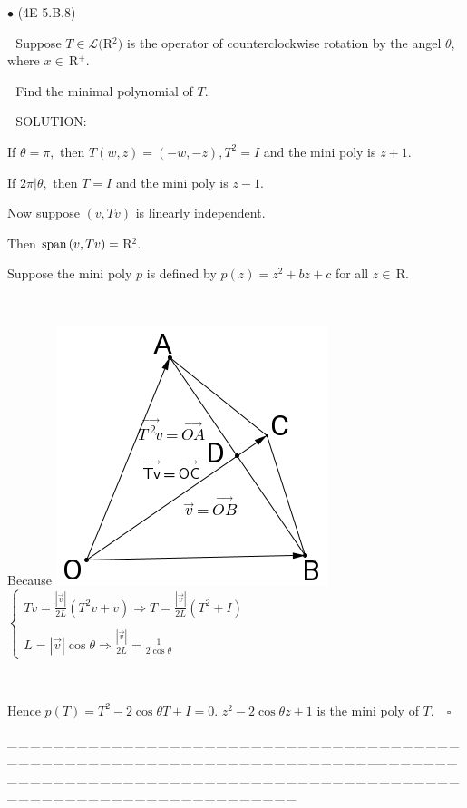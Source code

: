 \documentclass[a4paper, 11pt, UTF8]{article}
\def\Spn{\textup{span}\,}
\def\Lm{\mathcal{L}}
\def\Rbfc{$\,{\timesbf R}$}
\begin{document}
\begin{large}
{\small $\bullet$} ({\normalsize 4E 5.B.8})\par\,\, {\timessl\Large 
Suppose $T\in\Lm(${\timesbf R}$^2)$ is the operator of counterclockwise rotation by the angel $\theta$, where $x\in\Rbfc^+$.}\par\,\,
{\timessl\Large Find the minimal polynomial of $T$.}\par\,\,
{\timesbf S\footnotesize{OLUTION:}}\par\quad
If $\theta=\pi,$ then $T(w,z)=(-w,-z),T^2=I$ and the mini poly is $z+1.$\par\quad
If $2\pi|\theta,$ then $T=I$ and the mini poly is $z-1.$\par\quad
Now suppose $(v,Tv)$ is linearly independent.\par\quad
Then $\Spn(v,Tv)=\Rbfc^2.$\par\quad
Suppose the mini poly $p$ is defined by $p(z)=z^2+bz+c$ for all $z\in\Rbfc.$\par{\tiny\,\par}\quad
Because \includegraphics[scale=0.25]{./diagram.png} $\left\{\begin{array}{l}Tv=\displaystyle\frac{|\overset{\rightarrow}{v}|}{2L}(T^2 v+v)\Rightarrow T=\frac{|\overset{\rightarrow}{v}|}{2L}(T^2+I)\\\\ \displaystyle L=|\overset{\rightarrow}{v}|\cos\theta\Rightarrow\frac{|\overset{\rightarrow}{v}|}{2L}=\frac{1}{2\cos\theta}\end{array}\right.$\par{\tiny\,\par}\quad
Hence $p(T)=T^2-2\cos\theta T+I=0.$ $z^2-2\cos\theta z+1$ is the mini poly of $T.\quad\square$\par
{\tiny \_\,\_\,\_\,\_\,\_\,\_\,\_\,\_\,\_\,\_\,\_\,\_\,\_\,\_\,\_\,\_\,\_\,\_\,\_\,\_\,\_\,\_\,\_\,\_\,\_\,\_\,\_\,\_\,\_\,\_\,\_\,\_\,\_\,\_\,\_\,\_\,\_\,\_\,\_\,\_\,\_\,\_\,\_\,\_\,\_\,\_\,\_\,\_\,\_\,\_\,\_\,\_\,\_\,\_\,\_\,\_\,\_\,\_\,\_\,\_\,\_\,\_\,\_\,\_\,\_\,\_\,\_\,\_\,\_\,\_\,\_\_\,\_\,\_\,\_\,\_\,\_\,\_\,\_\,\_\,\_\,\_\,\_\,\_\,\_\,\_\,\_\,\_\,\_\,\_\,\_\,\_\,\_\,\_\,\_\,\_\,\_\,\_\,\_\,\_\,\_\,\_\,\_\,\_\,\_\,\_\,\_\,\_\,\_\,\_\,\_\,\_\,\_\,\_\,\_\,\_\,\_\,\_\,\_\,\_\,\_\,\_\,\_\,\_\,\_\,\_\,\_\,\_\,\_\,\_\,\_\,\_\,\_\,\_\,\_\,\_\,\_\,\_\,\_\,\_\,\_\,\_}\par{\tiny\,\par}


\end{large}
\end{document}
